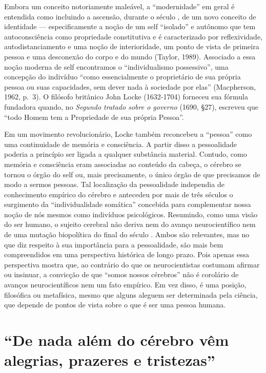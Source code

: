 Embora um conceito notoriamente maleável, a ``modernidade'' em geral é
entendida como incluindo a ascensão, durante o século , de um novo
conceito de identidade --- especificamente a noção de um self
``isolado'' e autônomo que tem autoconsciência como propriedade
constitutiva e é caracterizado por reflexividade, autodistanciamento e
uma noção de interioridade, um ponto de vista de primeira pessoa e uma
desconexão do corpo e do mundo (Taylor, 1989). Associado a essa noção
moderna de self encontramos o ``individualismo possessivo'', uma
concepção do indivíduo ``como essencialmente o proprietário de sua
própria pessoa ou suas capacidades, sem dever nada à sociedade por
elas'' (Macpherson, 1962, p.~3). O filósofo britânico John Locke
(1632-1704) forneceu sua fórmula fundadora quando, no \emph{Segundo
tratado sobre o governo} (1690, §27), escreveu que ``todo Homem tem a
Propriedade de sua própria Pessoa''.

Em um movimento revolucionário, Locke também reconcebeu a ``pessoa''
como uma continuidade de memória e consciência. A partir disso a
pessoalidade poderia a princípio ser ligada a qualquer substância
material. Contudo, como memória e consciência eram associadas ao
conteúdo da cabeça, o cérebro se tornou o órgão do self ou, mais
precisamente, o único órgão de que precisamos de modo a sermos pessoas.
Tal localização da pessoalidade independia de conhecimento empírico do
cérebro e antecedeu por mais de três séculos o surgimento da
``individualidade somática'' concebida para complementar nossa noção de
nós mesmos como indivíduos psicológicos. Resumindo, como uma visão do
ser humano, o sujeito cerebral não deriva nem do avanço neurocientífico
nem de uma mutação biopolítica do final do século . Ambos são
relevantes, mas no que diz respeito à sua importância para a
pessoalidade, são mais bem compreendidos em uma perspectiva histórica de
longo prazo. Pois apenas essa perspectiva mostra que, ao contrário do
que os neurocientistas costumam afirmar ou insinuar, a convicção de que
``somos nossos cérebros'' não é corolário de avanços neurocientíficos
nem um fato empírico. Em vez disso, é uma posição, filosófica ou
metafísica, mesmo que alguns aleguem ser determinada pela ciência, que
depende de pontos de vista sobre o que é ser uma pessoa humana.

\chapter{``De nada além do cérebro vêm alegrias, prazeres e tristezas''}

